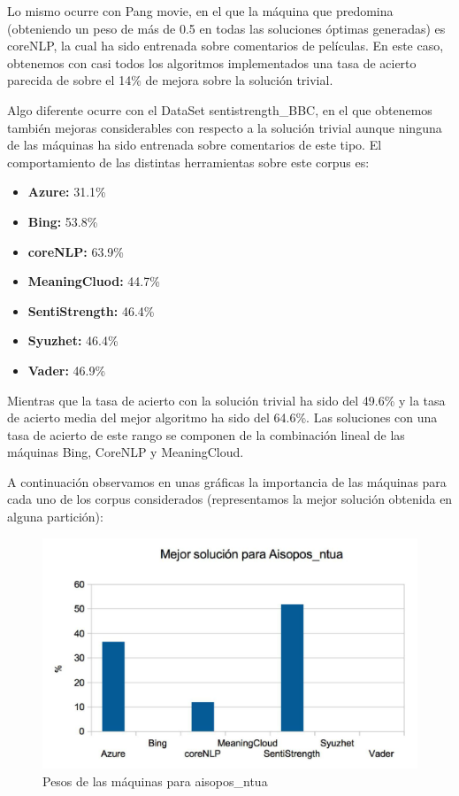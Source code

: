 \documentclass{article}
\begin{document}
Lo mismo ocurre con Pang movie, en el que la máquina que predomina (obteniendo un peso de más de 0.5 en todas las soluciones óptimas generadas) es coreNLP, la cual ha sido entrenada sobre comentarios de películas. En este caso, obtenemos con casi todos los algoritmos implementados una tasa de acierto parecida de sobre el 14\% de mejora sobre la solución trivial.

Algo diferente ocurre con el DataSet sentistrength\_BBC, en el que obtenemos también mejoras considerables con respecto a la solución trivial aunque ninguna de las máquinas ha sido entrenada sobre comentarios de este tipo. El comportamiento de las distintas herramientas sobre este corpus es:
\begin{itemize}
	\item \textbf{Azure: } 31.1\%
	\item \textbf{Bing: } 53.8\%
	\item \textbf{coreNLP: }63.9\%
	\item \textbf{MeaningCluod: } 44.7\%
	\item \textbf{SentiStrength: } 46.4\%
	\item \textbf{Syuzhet: }46.4\%
	\item \textbf{Vader: } 46.9\%
\end{itemize}

Mientras que la tasa de acierto con la solución trivial ha sido del 49.6\% y la tasa de acierto media del mejor algoritmo ha sido del 64.6\%. Las soluciones con una tasa de acierto de este rango se componen de la combinación lineal de las máquinas Bing, CoreNLP y MeaningCloud.

A continuación observamos en unas gráficas la importancia de las máquinas para cada uno de los corpus considerados (representamos la mejor solución obtenida en alguna partición):
\begin{figure}[H]
	\centering
	\includegraphics[width=0.7\linewidth]{aisopos_ntua}
	\caption{Pesos de las máquinas para aisopos\_ntua}
	\label{fig:aisoposntua}
\end{figure}
\end{document}

